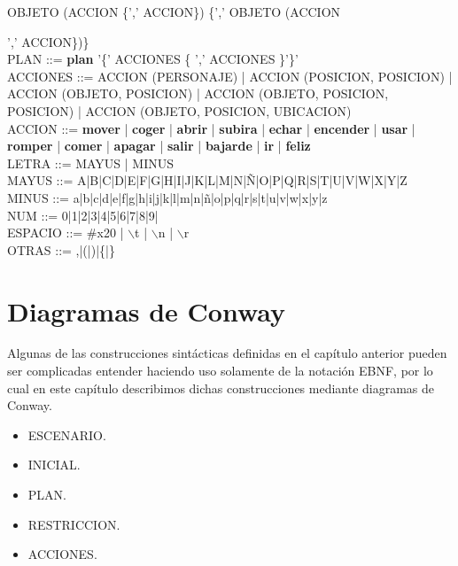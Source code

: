 \documentclass[11pt,a4paper,spanish,twoside]{book}
\theoremstyle{plain} \newtheorem{nota}{Nota}
\begin{document}
OBJETO (ACCION \{',' ACCION\}) \{',' OBJETO (ACCION {',' ACCION\})\}
\\
PLAN ::= \textbf{plan} '\{' ACCIONES \{ ',' ACCIONES \}'\}'
\\ 
ACCIONES ::= ACCION (PERSONAJE) | ACCION (POSICION, POSICION) | 
ACCION (OBJETO, POSICION) | ACCION (OBJETO, POSICION, POSICION) | 
ACCION (OBJETO, POSICION, UBICACION)
\\
ACCION ::= \textbf{mover} | \textbf{coger} | \textbf{abrir} | \textbf{subira} | 
\textbf{echar} | \textbf{encender} | \textbf{usar} | \textbf{romper} | 
\textbf{comer} | \textbf{apagar} | \textbf{salir} | \textbf{bajarde} | 
\textbf{ir} | \textbf{feliz}
\\
LETRA ::= MAYUS | MINUS
\\
MAYUS ::= A|B|C|D|E|F|G|H|I|J|K|L|M|N|Ñ|O|P|Q|R|S|T|U|V|W|X|Y|Z
\\
MINUS ::= a|b|c|d|e|f|g|h|i|j|k|l|m|n|ñ|o|p|q|r|s|t|u|v|w|x|y|z
\\
NUM ::= 0|1|2|3|4|5|6|7|8|9|
\\
ESPACIO ::= \#x20 | $\backslash$t | $\backslash$n | $\backslash$r
\\
OTRAS ::= ,|(|)|\{|\}

\chapter{Diagramas de Conway}
Algunas de las construcciones sintácticas definidas en el capítulo anterior
pueden ser complicadas entender haciendo uso solamente de la notación EBNF,
por lo cual en este capítulo describimos dichas construcciones mediante
diagramas de Conway.

\begin{itemize}
\item ESCENARIO.
\item INICIAL.
\item PLAN.
\item RESTRICCION.
 {}
\item ACCIONES.
\end{itemize}

}
\end{document}
